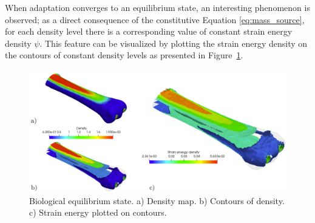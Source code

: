 \documentclass[11pt]{acmeArticle}
\numberwithin{equation}{section}
\begin{document}
When adaptation converges to an equilibrium state, an interesting phenomenon is observed; as a direct consequence of the constitutive Equation \ref{eq:mass_source}, for each density level there is a corresponding value of constant strain energy density $\psi$. This feature can be visualized by plotting the strain energy density on the contours of constant density levels as presented in Figure~\ref{fig:mc3_biol_eq}. 
\begin{figure}[h!]
	\begin{centering}
		\includegraphics[width=12cm]{Figures/mc3_biol_eq.png}
		\caption{Biological equilibrium state. a) Density map. b) Contours of density. c) Strain energy plotted on contours.}
		\label{fig:mc3_biol_eq}
	\end{centering}
\end{figure}
\end{document}
